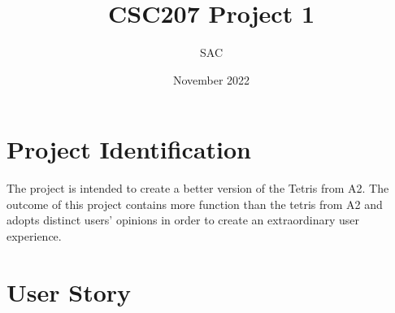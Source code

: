 \documentclass{article}
\title{CSC207 Project 1}
\author{SAC}
\date{November 2022}
\begin{document}
\maketitle

\thispagestyle{fancy}

\section{Project Identification}
 The project is intended to create a better version of the Tetris from A2. The outcome of this project contains more function than the tetris from A2 and adopts distinct users' opinions in order to create an extraordinary user experience.
\section{User Story}
\end{document}
